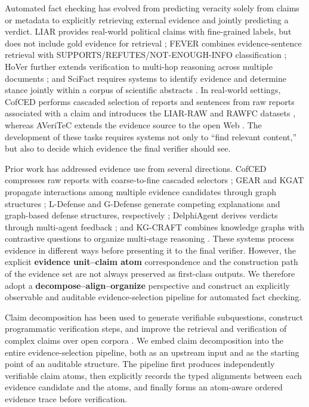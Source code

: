 \documentclass[letterpaper]{article}
\begin{document}
Automated fact checking has evolved from predicting veracity solely from claims or metadata to explicitly retrieving external evidence and jointly predicting a verdict. LIAR provides real-world political claims with fine-grained labels, but does not include gold evidence for retrieval \citep{Wang2017LIAR}; FEVER combines evidence-sentence retrieval with SUPPORTS/REFUTES/NOT-ENOUGH-INFO classification \citep{Thorne2018FEVER}; HoVer further extends verification to multi-hop reasoning across multiple documents \citep{Jiang2020HoVer}; and SciFact requires systems to identify evidence and determine stance jointly within a corpus of scientific abstracts \citep{Wadden2020SciFact}. In real-world settings, CofCED performs cascaded selection of reports and sentences from raw reports associated with a claim and introduces the LIAR-RAW and RAWFC datasets \citep{Yang2022CofCED}, whereas AVeriTeC extends the evidence source to the open Web \citep{Schlichtkrull2023AVeriTeC}. The development of these tasks requires systems not only to ``find relevant content,'' but also to decide which evidence the final verifier should see.

Prior work has addressed evidence use from several directions. CofCED compresses raw reports with coarse-to-fine cascaded selectors \citep{Yang2022CofCED}; GEAR and KGAT propagate interactions among multiple evidence candidates through graph structures \citep{Zhou2019GEAR,Liu2019KGAT}; L-Defense and G-Defense generate competing explanations and graph-based defense structures, respectively \citep{Wang2024LDefense,Wang2026GDefense}; DelphiAgent derives verdicts through multi-agent feedback \citep{Xiong2025DelphiAgent}; and KG-CRAFT combines knowledge graphs with contrastive questions to organize multi-stage reasoning \citep{Lourenco2026KGCRAFT}. These systems process evidence in different ways before presenting it to the final verifier. However, the explicit \textbf{evidence unit--claim atom} correspondence and the construction path of the evidence set are not always preserved as first-class outputs. We therefore adopt a \textbf{decompose--align--organize} perspective and construct an explicitly observable and auditable evidence-selection pipeline for automated fact checking.

Claim decomposition has been used to generate verifiable subquestions, construct programmatic verification steps, and improve the retrieval and verification of complex claims over open corpora \citep{Chen2022ClaimDecomp,Pan2023ProgramFC,Chen2023WildEvidence}. We embed claim decomposition into the entire evidence-selection pipeline, both as an upstream input and as the starting point of an auditable structure. The pipeline first produces independently verifiable claim atoms, then explicitly records the typed alignments between each evidence candidate and the atoms, and finally forms an atom-aware ordered evidence trace before verification.
\end{document}
